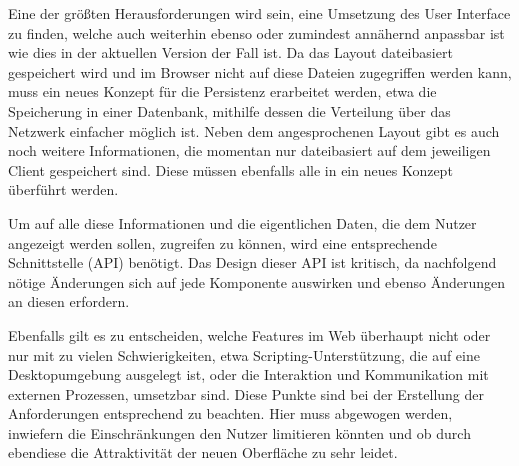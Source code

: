 Eine der größten Herausforderungen wird sein, eine Umsetzung des User Interface zu finden, welche auch weiterhin ebenso oder zumindest annähernd anpassbar ist wie dies in der aktuellen Version der Fall ist. Da das Layout dateibasiert gespeichert wird und im Browser nicht auf diese Dateien zugegriffen werden kann, muss ein neues Konzept für die Persistenz erarbeitet werden, etwa die Speicherung in einer Datenbank, mithilfe dessen die Verteilung über das Netzwerk einfacher möglich ist. 
Neben dem angesprochenen Layout gibt es auch noch weitere Informationen, die momentan nur dateibasiert auf dem jeweiligen Client gespeichert sind. Diese müssen ebenfalls alle in ein neues Konzept überführt werden.

Um auf alle diese Informationen und die eigentlichen Daten, die dem Nutzer angezeigt werden sollen, zugreifen zu können, wird eine entsprechende Schnittstelle (API) benötigt. Das Design dieser API ist kritisch, da nachfolgend nötige Änderungen sich auf jede Komponente auswirken und ebenso Änderungen an diesen erfordern. 

Ebenfalls gilt es zu entscheiden, welche Features im Web überhaupt nicht oder nur mit zu vielen Schwierigkeiten, etwa Scripting-Unterstützung, die auf eine Desktopumgebung ausgelegt ist, oder die Interaktion und Kommunikation mit externen Prozessen, umsetzbar sind. Diese Punkte sind bei der Erstellung der Anforderungen entsprechend zu beachten. Hier muss abgewogen werden, inwiefern die Einschränkungen den Nutzer limitieren könnten und ob durch ebendiese die Attraktivität der neuen Oberfläche zu sehr leidet.

